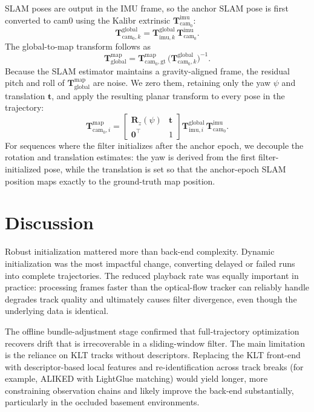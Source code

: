 \documentclass[journal]{IEEEtran}
\begin{document}
SLAM poses are output in the IMU frame, so the anchor SLAM pose is first
converted to cam0 using the Kalibr extrinsic $\mathbf{T}^{\text{imu}}_{\text{cam}_0}$:
\begin{equation}
  \mathbf{T}^{\text{global}}_{\text{cam}_0,k}
    = \mathbf{T}^{\text{global}}_{\text{imu},k}\,\mathbf{T}^{\text{imu}}_{\text{cam}_0}.
\end{equation}
The global-to-map transform follows as
\begin{equation}
  \mathbf{T}^{\text{map}}_{\text{global}}
    = \mathbf{T}^{\text{map}}_{\text{cam}_0,\text{gt}}\,
      \bigl(\mathbf{T}^{\text{global}}_{\text{cam}_0,k}\bigr)^{-1}.
\end{equation}
Because the SLAM estimator maintains a gravity-aligned frame, the residual
pitch and roll of $\mathbf{T}^{\text{map}}_{\text{global}}$ are noise.
We zero them, retaining only the yaw $\psi$ and translation $\mathbf{t}$,
and apply the resulting planar transform to every pose in the trajectory:
\begin{equation}
  \mathbf{T}^{\text{map}}_{\text{cam}_0,i}
    = \begin{bmatrix} \mathbf{R}_z(\psi) & \mathbf{t} \\ \mathbf{0}^\top & 1 \end{bmatrix}
      \mathbf{T}^{\text{global}}_{\text{imu},i}\,\mathbf{T}^{\text{imu}}_{\text{cam}_0}.
\end{equation}
For sequences where the filter initializes after the anchor epoch, we
decouple the rotation and translation estimates: the yaw is derived from
the first filter-initialized pose, while the translation is set so that
the anchor-epoch SLAM position maps exactly to the ground-truth map position.


\section{Discussion}

Robust initialization mattered more than back-end complexity.
Dynamic initialization was the most impactful change, converting delayed or
failed runs into complete trajectories.
The reduced playback rate was equally important in practice: processing frames
faster than the optical-flow tracker can reliably handle degrades track
quality and ultimately causes filter divergence, even though the underlying
data is identical.

The offline bundle-adjustment stage confirmed that full-trajectory
optimization recovers drift that is irrecoverable in a sliding-window filter.
The main limitation is the reliance on KLT tracks without descriptors.
Replacing the KLT front-end with descriptor-based local features and
re-identification across track breaks (for example, ALIKED with LightGlue
matching) would yield longer, more constraining observation chains and
likely improve the back-end substantially, particularly in the occluded
basement environments.
\end{document}
